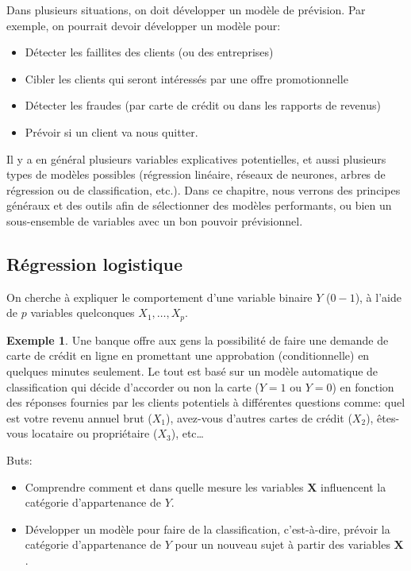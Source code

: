\documentclass[
  11pt,
  letterpaper,
]{book}
\providecommand{\tightlist}{%
  \setlength{\itemsep}{0pt}\setlength{\parskip}{0pt}}
\theoremstyle{definition}
\theoremstyle{definition}
\newtheorem{example}{Exemple}[chapter]
\theoremstyle{definition}
\theoremstyle{definition}
\theoremstyle{remark}
\begin{document}
Dans plusieurs situations, on doit développer un modèle de prévision. Par exemple, on pourrait devoir développer un modèle pour:

\begin{itemize}
\tightlist
\item
  Détecter les faillites des clients (ou des entreprises)
\item
  Cibler les clients qui seront intéressés par une offre promotionnelle
\item
  Détecter les fraudes (par carte de crédit ou dans les rapports de revenus)
\item
  Prévoir si un client va nous quitter.
\end{itemize}

Il y a en général plusieurs variables explicatives potentielles, et aussi plusieurs types de modèles possibles (régression linéaire, réseaux de neurones, arbres de régression ou de classification, etc.). Dans ce chapitre, nous verrons des principes généraux et des outils afin de sélectionner des modèles performants, ou bien un sous-ensemble de variables avec un bon pouvoir prévisionnel.

\hypertarget{ruxe9gression-logistique}{%
\subsection{Régression logistique}\label{ruxe9gression-logistique}}

On cherche à expliquer le comportement d'une variable binaire \(Y\) (\(0-1\)), à l'aide de \(p\) variables quelconques \(X_1, \ldots, X_p\).

\begin{example}
\protect\hypertarget{exm:unnamed-chunk-3}{}{\label{exm:unnamed-chunk-3} }Une banque offre aux gens la possibilité de faire une demande de carte de crédit en ligne en promettant une approbation (conditionnelle) en quelques minutes seulement. Le tout est basé sur un modèle automatique de classification qui décide d'accorder ou non la carte (\(Y=1\) ou \(Y=0\)) en fonction des réponses fournies par les clients potentiels à différentes questions comme: quel est votre revenu annuel brut (\(X_1\)), avez-vous d'autres cartes de crédit (\(X_2\)), êtes-vous locataire ou propriétaire (\(X_3\)), etc\ldots
\end{example}

Buts:

\begin{itemize}
\tightlist
\item
  Comprendre comment et dans quelle mesure les variables \(\boldsymbol{X}\) influencent la catégorie d'appartenance de \(Y\).
\item
  Développer un modèle pour faire de la classification, c'est-à-dire, prévoir la catégorie d'appartenance de \(Y\) pour un nouveau sujet à partir des variables \(\boldsymbol{X}\).
\end{itemize}
\end{document}
